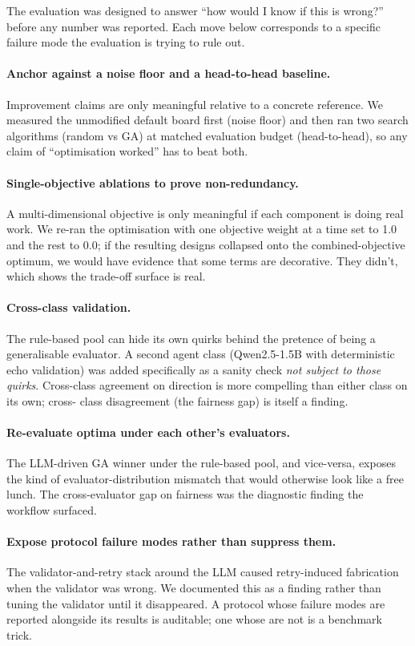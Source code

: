\documentclass[10pt]{article}
\begin{document}
The evaluation was designed to answer ``how would I know if this is
wrong?'' before any number was reported. Each move below corresponds
to a specific failure mode the evaluation is trying to rule out.

\paragraph{Anchor against a noise floor and a head-to-head
baseline.} Improvement claims are only meaningful relative to a
concrete reference. We measured the unmodified default board first
(noise floor) and then ran two search algorithms (random vs GA) at
matched evaluation budget (head-to-head), so any claim of
``optimisation worked'' has to beat both.

\paragraph{Single-objective ablations to prove non-redundancy.}
A multi-dimensional objective is only meaningful if each component
is doing real work. We re-ran the optimisation with one objective
weight at a time set to 1.0 and the rest to 0.0; if the resulting
designs collapsed onto the combined-objective optimum, we would
have evidence that some terms are decorative. They didn't, which
shows the trade-off surface is real.

\paragraph{Cross-class validation.} The rule-based pool can hide
its own quirks behind the pretence of being a generalisable
evaluator. A second agent class (Qwen2.5-1.5B with deterministic
echo validation) was added specifically as a sanity check
\emph{not subject to those quirks}. Cross-class agreement on
direction is more compelling than either class on its own; cross-
class disagreement (the fairness gap) is itself a finding.

\paragraph{Re-evaluate optima under each other's evaluators.} The
LLM-driven GA winner under the rule-based pool, and vice-versa,
exposes the kind of evaluator-distribution mismatch that would
otherwise look like a free lunch. The cross-evaluator gap on
fairness was the diagnostic finding the workflow surfaced.

\paragraph{Expose protocol failure modes rather than suppress
them.} The validator-and-retry stack around the LLM caused
retry-induced fabrication when the validator was wrong. We
documented this as a finding rather than tuning the validator until
it disappeared. A protocol whose failure modes are reported
alongside its results is auditable; one whose are not is a
benchmark trick.
\end{document}
